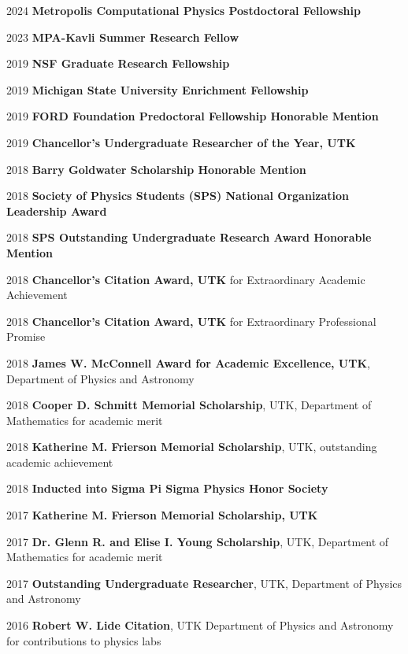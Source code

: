 \documentclass[11pt]{vitae}
\begin{document}
\begin{chronlist}
\item[2024] \textbf{Metropolis Computational Physics Postdoctoral Fellowship}
\item[2023] \textbf{MPA-Kavli Summer Research Fellow}
\item[2019] \textbf{NSF Graduate Research Fellowship}
\item[2019] \textbf{Michigan State University Enrichment Fellowship}
\item[2019] \textbf{FORD Foundation Predoctoral Fellowship Honorable Mention}
\item[2019] \textbf{Chancellor's Undergraduate Researcher of the Year, UTK}
\item[2018] \textbf{Barry Goldwater Scholarship Honorable Mention}
\item[2018] \textbf{Society of Physics Students (SPS) National Organization Leadership Award}
\item[2018] \textbf{SPS Outstanding Undergraduate Research Award Honorable Mention}
\item[2018] \textbf{Chancellor’s Citation Award, UTK} for Extraordinary Academic Achievement
\item[2018] \textbf{Chancellor’s Citation Award, UTK} for Extraordinary Professional Promise
\item[2018] \textbf{James W. McConnell Award for Academic Excellence, UTK}, Department of Physics and Astronomy
\item[2018] \textbf{Cooper D. Schmitt Memorial Scholarship}, UTK, Department of Mathematics for academic merit
\item[2018] \textbf{Katherine M. Frierson Memorial Scholarship}, UTK, outstanding academic achievement
  \item[2018] \textbf{Inducted into Sigma Pi Sigma Physics Honor Society}
  \item[2017] \textbf{Katherine M. Frierson Memorial Scholarship, UTK}
  \item[2017] \textbf{Dr. Glenn R. and Elise I. Young Scholarship}, UTK, Department of Mathematics for academic merit
  \item[2017] \textbf{Outstanding Undergraduate Researcher}, UTK, Department of Physics and Astronomy
  \item[2016] \textbf{Robert W. Lide Citation}, UTK
          Department of Physics and Astronomy for contributions to physics labs
\end{chronlist}
\end{document}
